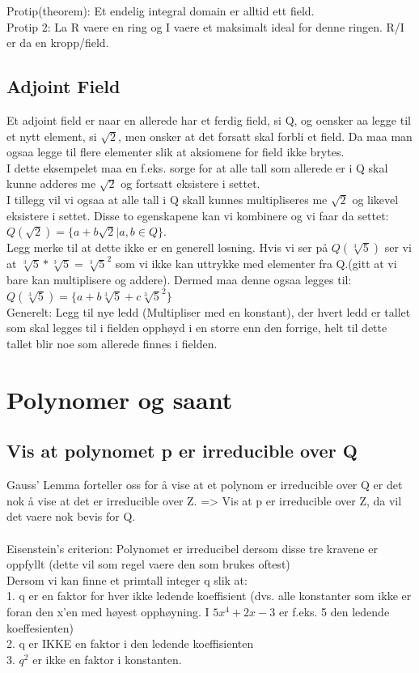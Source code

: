 \documentclass[12pt,a4paper]{article}
\begin{document}
Protip(theorem): Et endelig integral domain er alltid ett field. \\
Protip 2: La R vaere en ring og I vaere et maksimalt ideal for denne ringen. R/I er da en kropp/field. 

\subsection*{Adjoint Field}
Et adjoint field er naar en allerede har et ferdig field, si Q, og oensker aa legge til et nytt element, si $\sqrt{2}$, men onsker at det forsatt skal forbli et field. Da maa man ogsaa legge til flere elementer slik at aksiomene for field ikke brytes.\\
I dette eksempelet maa en f.eks. sorge for at alle tall som allerede er i Q skal kunne adderes me $\sqrt{2}$ og fortsatt eksistere i settet.\\
I tillegg vil vi ogsaa at alle tall i Q skall kunnes multipliseres me $\sqrt{2}$ og likevel eksistere i settet. Disse to egenskapene kan vi kombinere og vi faar da settet:\\
$Q(\sqrt{2}) = \{a + b\sqrt{2} | a,b \in Q\}$.\\
Legg merke til at dette ikke er en generell losning. Hvis vi ser på $Q(\sqrt[3]{5})$ ser vi at $\sqrt[3]{5} * \sqrt[3]{5} = \sqrt[3]{5} ^ 2 $ som vi ikke kan uttrykke med elementer fra Q.(gitt at vi bare kan multiplisere og addere). Dermed maa denne ogsaa legges til:\\
$Q(\sqrt[3]{5}) = \{a+b\sqrt[3]{5} + c \sqrt[3]{5}^2\}$  \\
Generelt: Legg til nye ledd (Multipliser med en konstant), der hvert ledd er tallet som skal legges til i fielden opphøyd i en storre enn den forrige, helt til dette tallet blir noe som allerede finnes i fielden. 

\section*{Polynomer og saant}

\subsection*{Vis at polynomet p er irreducible over Q}
Gauss' Lemma forteller oss for å vise at et polynom er irreducible over Q er det nok å vise at det er irreducible over Z. => Vis at p er irreducible over Z, da vil det vaere nok bevis for Q.
\\\\
Eisenstein's criterion: Polynomet er irreducibel dersom disse tre kravene er oppfyllt (dette vil som regel vaere den som brukes oftest)\\
Dersom vi kan finne et primtall integer q slik at:\\
1. q er en faktor for hver ikke ledende koeffisient (dvs. alle konstanter som ikke er foran den x'en med høyest opphøyning. I $5x^4 +2x -3$ er f.eks. 5 den ledende koeffesienten)\\
2. q er IKKE en faktor i den ledende koeffisienten\\
3. $q^2$ er ikke en faktor i konstanten. \\\\
\end{document}
